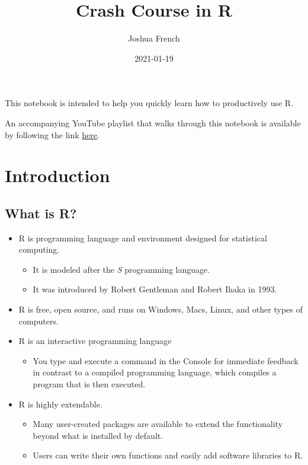 \documentclass[
]{article}
\title{Crash Course in R}
\author{Joshua French}
\date{2021-01-19}
\providecommand{\tightlist}{%
  \setlength{\itemsep}{0pt}\setlength{\parskip}{0pt}}
\begin{document}
\maketitle

This notebook is intended to help you quickly learn how to productively
use R.

An accompanying YouTube playlist that walks through this notebook is
available by following the link
\href{https://www.youtube.com/playlist?list=PLkrJrLs7xfbUNe79bzEetcE0g-vHZT8XR}{here}.

\hypertarget{introduction}{%
\section{Introduction}\label{introduction}}

\hypertarget{what-is-r}{%
\subsection{What is R?}\label{what-is-r}}

\begin{itemize}
\tightlist
\item
  R is programming language and environment designed for statistical
  computing.

  \begin{itemize}
  \tightlist
  \item
    It is modeled after the \emph{S} programming language.
  \item
    It was introduced by Robert Gentleman and Robert Ihaka in 1993.
  \end{itemize}
\item
  R is free, open source, and runs on Windows, Macs, Linux, and other
  types of computers.
\item
  R is an interactive programming language

  \begin{itemize}
  \tightlist
  \item
    You type and execute a command in the Console for immediate feedback
    in contrast to a compiled programming language, which compiles a
    program that is then executed.
  \end{itemize}
\item
  R is highly extendable.

  \begin{itemize}
  \tightlist
  \item
    Many user-created packages are available to extend the functionality
    beyond what is installed by default.
  \item
    Users can write their own functions and easily add software
    libraries to R.
  \end{itemize}
\end{itemize}
\end{document}
